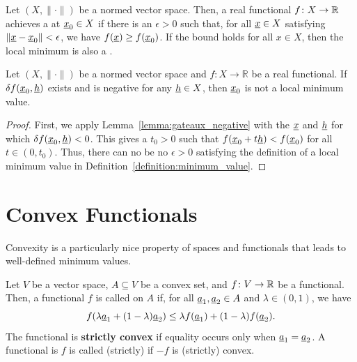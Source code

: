 \begin{definition}
\label{definition:minimum_value}
Let $(X,\|\cdot\|)$ be a normed vector space.
Then, a real functional $f \colon X \rightarrow \mathbb{R}$ achieves a  at $\underline{x}_0 \in X$ if there is an $\epsilon > 0$ such that, for all $\underline{x}\in X$ satisfying $\| \underline{x} - \underline{x}_0 \| < \epsilon$, we have  $f(\underline{x}) \geq f(\underline{x}_0)$.
If the bound holds for all $x\in X$, then the local minimum is also a .
\end{definition}

\begin{theorem}
Let $(X,\|\cdot\|)$ be a normed vector space and $f\colon X \to \mathbb{R}$ be a real functional.
If $\delta f (\underline{x}_0,\underline{h})$ exists and is negative for any $\underline{h} \in X$, then $\underline{x}_0$ is not a local minimum value.
\end{theorem}
\begin{proof}
First, we apply Lemma~\ref{lemma:gateaux_negative} with the $\underline{x}$ and $\underline{h}$ for which $\delta f (\underline{x}_0,\underline{h})<0$.
This gives a $t_0 >0$ such that $f(\underline{x}_0+t \underline{h})<f(\underline{x}_0)$ for all $t\in (0,t_0)$.
Thus, there can no be no $\epsilon>0$ satisfying the definition of a local minimum value in  Definition~\ref{definition:minimum_value}.
\end{proof}

\section{Convex Functionals}

Convexity is a particularly nice property of spaces and functionals that leads to well-defined minimum values.




\begin{definition}
Let $V$ be a vector space, $A \subseteq V$ be a convex set, and $f \colon V \rightarrow \mathbb{R}$ be a functional.
Then, a functional $f$ is called  on $A$ if, for all $\underline{a}_1,\underline{a}_2 \in A$ and $\lambda\in(0,1)$, we have
\[ f( \lambda \underline{a}_1 + (1-\lambda) \underline{a}_2 ) \leq \lambda f( \underline{a}_1 ) + (1-\lambda) f ( \underline{a}_2 ). \]
The functional is \textbf{strictly convex} if equality occurs only when $\underline{a}_1 = \underline{a}_2$.
A functional is $f$ is called (strictly)  if $-f$ is (strictly) convex.
\end{definition}

